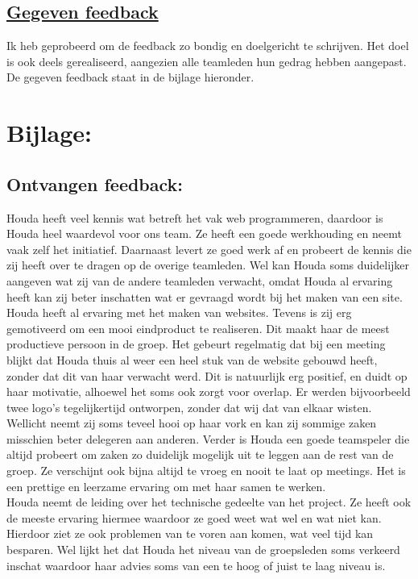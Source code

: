 \documentclass[12pt,a4paper,oneside]{article}
\begin{document}
\subsection*{\underline{Gegeven feedback}}

Ik heb geprobeerd om de feedback zo bondig en doelgericht te schrijven. Het doel is ook deels gerealiseerd, aangezien alle teamleden hun gedrag hebben aangepast. De gegeven feedback staat in de bijlage hieronder.

\newpage

\section*{Bijlage:}

\subsection*{Ontvangen feedback:}

Houda heeft veel kennis wat betreft het vak web programmeren, daardoor is Houda heel waardevol voor ons team. Ze heeft een goede werkhouding en neemt vaak zelf het initiatief. Daarnaast levert ze goed werk af en probeert de kennis die zij heeft over te dragen op de overige teamleden. Wel kan Houda soms duidelijker aangeven wat zij van de andere teamleden verwacht, omdat Houda al ervaring heeft kan zij beter inschatten wat er gevraagd wordt bij het maken van een site. \\

Houda heeft al ervaring met het maken van websites. Tevens is zij erg gemotiveerd om een mooi eindproduct te realiseren. Dit maakt haar de meest productieve persoon in de groep. Het gebeurt regelmatig dat bij een meeting blijkt dat Houda thuis al weer een heel stuk van de website gebouwd heeft, zonder dat dit van haar verwacht werd. Dit is natuurlijk erg positief, en duidt op haar motivatie, alhoewel het soms ook zorgt voor overlap. Er werden bijvoorbeeld twee logo’s tegelijkertijd ontworpen, zonder dat wij dat van elkaar wisten. Wellicht neemt zij soms teveel hooi op haar vork en kan  zij sommige zaken misschien beter delegeren aan anderen.
Verder is Houda een goede teamspeler die altijd probeert om zaken zo duidelijk mogelijk uit te leggen aan de rest van de groep. Ze verschijnt ook bijna altijd te vroeg en nooit te laat op meetings. Het is een prettige en leerzame ervaring om met haar samen te werken. \\

Houda neemt de leiding over het technische gedeelte van het project. Ze heeft ook de meeste ervaring hiermee waardoor ze goed weet wat wel en wat niet kan. Hierdoor ziet ze ook problemen van te voren aan komen, wat veel tijd kan besparen. Wel lijkt het dat Houda het niveau van de groepsleden soms verkeerd inschat waardoor haar advies soms van een te hoog of juist te laag niveau is.  
\end{document}
